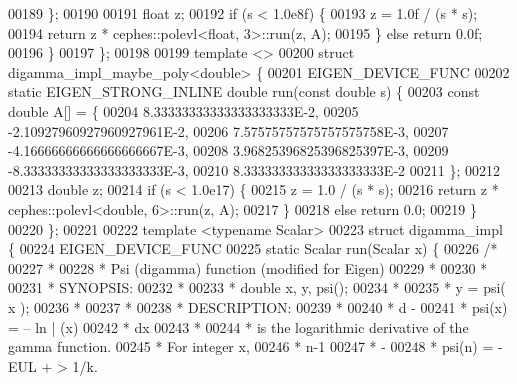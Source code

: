\begin{DoxyCode}
00189     \};
00190 
00191     \textcolor{keywordtype}{float} z;
00192     \textcolor{keywordflow}{if} (s < 1.0e8f) \{
00193       z = 1.0f / (s * s);
00194       \textcolor{keywordflow}{return} z * cephes::polevl<float, 3>::run(z, A);
00195     \} \textcolor{keywordflow}{else} \textcolor{keywordflow}{return} 0.0f;
00196   \}
00197 \};
00198 
00199 \textcolor{keyword}{template} <>
00200 \textcolor{keyword}{struct }digamma\_impl\_maybe\_poly<double> \{
00201   EIGEN\_DEVICE\_FUNC
00202   \textcolor{keyword}{static} EIGEN\_STRONG\_INLINE \textcolor{keywordtype}{double} run(\textcolor{keyword}{const} \textcolor{keywordtype}{double} s) \{
00203     \textcolor{keyword}{const} \textcolor{keywordtype}{double} A[] = \{
00204       8.33333333333333333333E-2,
00205       -2.10927960927960927961E-2,
00206       7.57575757575757575758E-3,
00207       -4.16666666666666666667E-3,
00208       3.96825396825396825397E-3,
00209       -8.33333333333333333333E-3,
00210       8.33333333333333333333E-2
00211     \};
00212 
00213     \textcolor{keywordtype}{double} z;
00214     \textcolor{keywordflow}{if} (s < 1.0e17) \{
00215       z = 1.0 / (s * s);
00216       \textcolor{keywordflow}{return} z * cephes::polevl<double, 6>::run(z, A);
00217     \}
00218     \textcolor{keywordflow}{else} \textcolor{keywordflow}{return} 0.0;
00219   \}
00220 \};
00221 
00222 \textcolor{keyword}{template} <\textcolor{keyword}{typename} Scalar>
00223 \textcolor{keyword}{struct }digamma\_impl \{
00224   EIGEN\_DEVICE\_FUNC
00225   \textcolor{keyword}{static} Scalar run(Scalar x) \{
00226     \textcolor{comment}{/*}
00227 \textcolor{comment}{     *}
00228 \textcolor{comment}{     *     Psi (digamma) function (modified for Eigen)}
00229 \textcolor{comment}{     *}
00230 \textcolor{comment}{     *}
00231 \textcolor{comment}{     * SYNOPSIS:}
00232 \textcolor{comment}{     *}
00233 \textcolor{comment}{     * double x, y, psi();}
00234 \textcolor{comment}{     *}
00235 \textcolor{comment}{     * y = psi( x );}
00236 \textcolor{comment}{     *}
00237 \textcolor{comment}{     *}
00238 \textcolor{comment}{     * DESCRIPTION:}
00239 \textcolor{comment}{     *}
00240 \textcolor{comment}{     *              d      -}
00241 \textcolor{comment}{     *   psi(x)  =  -- ln | (x)}
00242 \textcolor{comment}{     *              dx}
00243 \textcolor{comment}{     *}
00244 \textcolor{comment}{     * is the logarithmic derivative of the gamma function.}
00245 \textcolor{comment}{     * For integer x,}
00246 \textcolor{comment}{     *                   n-1}
00247 \textcolor{comment}{     *                    -}
00248 \textcolor{comment}{     * psi(n) = -EUL  +   >  1/k.}

\end{DoxyCode}
